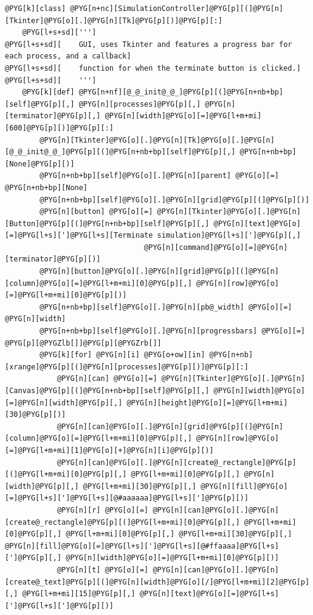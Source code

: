 \documentclass[letterpaper,10pt,english]{manual}
\begin{document}
\begin{Verbatim}[commandchars=@\[\]]
@PYG[k][class] @PYG[n+nc][SimulationController]@PYG[p][(]@PYG[n][Tkinter]@PYG[o][.]@PYG[n][Tk]@PYG[p][)]@PYG[p][:]
    @PYG[l+s+sd][''']
@PYG[l+s+sd][    GUI, uses Tkinter and features a progress bar for each process, and a callback]
@PYG[l+s+sd][    function for when the terminate button is clicked.]
@PYG[l+s+sd][    ''']
    @PYG[k][def] @PYG[n+nf][@_@_init@_@_]@PYG[p][(]@PYG[n+nb+bp][self]@PYG[p][,] @PYG[n][processes]@PYG[p][,] @PYG[n][terminator]@PYG[p][,] @PYG[n][width]@PYG[o][=]@PYG[l+m+mi][600]@PYG[p][)]@PYG[p][:]
        @PYG[n][Tkinter]@PYG[o][.]@PYG[n][Tk]@PYG[o][.]@PYG[n][@_@_init@_@_]@PYG[p][(]@PYG[n+nb+bp][self]@PYG[p][,] @PYG[n+nb+bp][None]@PYG[p][)]
        @PYG[n+nb+bp][self]@PYG[o][.]@PYG[n][parent] @PYG[o][=] @PYG[n+nb+bp][None]
        @PYG[n+nb+bp][self]@PYG[o][.]@PYG[n][grid]@PYG[p][(]@PYG[p][)]
        @PYG[n][button] @PYG[o][=] @PYG[n][Tkinter]@PYG[o][.]@PYG[n][Button]@PYG[p][(]@PYG[n+nb+bp][self]@PYG[p][,] @PYG[n][text]@PYG[o][=]@PYG[l+s][']@PYG[l+s][Terminate simulation]@PYG[l+s][']@PYG[p][,]
                                @PYG[n][command]@PYG[o][=]@PYG[n][terminator]@PYG[p][)]
        @PYG[n][button]@PYG[o][.]@PYG[n][grid]@PYG[p][(]@PYG[n][column]@PYG[o][=]@PYG[l+m+mi][0]@PYG[p][,] @PYG[n][row]@PYG[o][=]@PYG[l+m+mi][0]@PYG[p][)]
        @PYG[n+nb+bp][self]@PYG[o][.]@PYG[n][pb@_width] @PYG[o][=] @PYG[n][width]
        @PYG[n+nb+bp][self]@PYG[o][.]@PYG[n][progressbars] @PYG[o][=] @PYG[p][@PYGZlb[]]@PYG[p][@PYGZrb[]]
        @PYG[k][for] @PYG[n][i] @PYG[o+ow][in] @PYG[n+nb][xrange]@PYG[p][(]@PYG[n][processes]@PYG[p][)]@PYG[p][:]
            @PYG[n][can] @PYG[o][=] @PYG[n][Tkinter]@PYG[o][.]@PYG[n][Canvas]@PYG[p][(]@PYG[n+nb+bp][self]@PYG[p][,] @PYG[n][width]@PYG[o][=]@PYG[n][width]@PYG[p][,] @PYG[n][height]@PYG[o][=]@PYG[l+m+mi][30]@PYG[p][)]
            @PYG[n][can]@PYG[o][.]@PYG[n][grid]@PYG[p][(]@PYG[n][column]@PYG[o][=]@PYG[l+m+mi][0]@PYG[p][,] @PYG[n][row]@PYG[o][=]@PYG[l+m+mi][1]@PYG[o][+]@PYG[n][i]@PYG[p][)]
            @PYG[n][can]@PYG[o][.]@PYG[n][create@_rectangle]@PYG[p][(]@PYG[l+m+mi][0]@PYG[p][,] @PYG[l+m+mi][0]@PYG[p][,] @PYG[n][width]@PYG[p][,] @PYG[l+m+mi][30]@PYG[p][,] @PYG[n][fill]@PYG[o][=]@PYG[l+s][']@PYG[l+s][@#aaaaaa]@PYG[l+s][']@PYG[p][)]
            @PYG[n][r] @PYG[o][=] @PYG[n][can]@PYG[o][.]@PYG[n][create@_rectangle]@PYG[p][(]@PYG[l+m+mi][0]@PYG[p][,] @PYG[l+m+mi][0]@PYG[p][,] @PYG[l+m+mi][0]@PYG[p][,] @PYG[l+m+mi][30]@PYG[p][,] @PYG[n][fill]@PYG[o][=]@PYG[l+s][']@PYG[l+s][@#ffaaaa]@PYG[l+s][']@PYG[p][,] @PYG[n][width]@PYG[o][=]@PYG[l+m+mi][0]@PYG[p][)]
            @PYG[n][t] @PYG[o][=] @PYG[n][can]@PYG[o][.]@PYG[n][create@_text]@PYG[p][(]@PYG[n][width]@PYG[o][/]@PYG[l+m+mi][2]@PYG[p][,] @PYG[l+m+mi][15]@PYG[p][,] @PYG[n][text]@PYG[o][=]@PYG[l+s][']@PYG[l+s][']@PYG[p][)]

\end{Verbatim}
\end{document}
